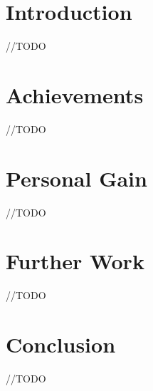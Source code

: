 \documentclass[12pt,twoside,a4paper]{report}
\begin{document}
\section{Introduction}\label{6.1}
//TODO

\section{Achievements}\label{6.2}
//TODO

\section{Personal Gain}\label{6.3}
//TODO

\section{Further Work}\label{6.4}
//TODO

\section{Conclusion}\label{6.5}
//TODO
\end{document}
